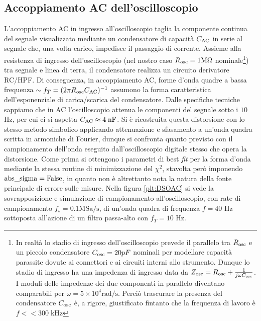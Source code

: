 \documentclass{article}[a4paper, oneside ,11pt]
\begin{document}
\subsection{Accoppiamento AC dell'oscilloscopio}
L’accoppiamento AC in ingresso all’oscilloscopio taglia la componente continua del segnale visualizzato mediante un condensatore di capacità $C_{\rm AC}$ in serie al segnale che, una volta carico, impedisce il passaggio di corrente. Assieme alla resistenza di ingresso dell’oscilloscopio (nel nostro caso $R_{\rm osc} = 1 \si{\mega\ohm}$ nominale\footnote{In realtà lo stadio di ingresso dell’oscilloscopio prevede il parallelo tra $R_{\rm osc}$ e un piccolo condensatore $C_{\rm osc} = 20 pF$ nominali per modellare capacità parassite dovute ai connettori e ai circuiti interni allo strumento. Dunque lo stadio di ingresso ha una impedenza di ingresso data da $Z_{\rm osc}= R_{\rm osc} + \frac{1}{j \omega C_{\rm osc}} $. I moduli delle impedenze dei due componenti in parallelo diventano comparabili per $\omega = 5 \times 10^4 \si{\radian\per\s}$. Perciò trascurare la presenza del condensatore $C_{\rm osc}$ è, a rigore, giustificato fintanto che la frequenza di lavoro è $f << 300 \; \si{\kilo\hertz}$}) tra segnale e linea di terra, il condensatore realizza un circuito derivatore RC/HPF. Di conseguenza, in accoppiamento AC,  forme d’onda quadre a bassa frequenza $\sim f_T = (2\pi R_{\rm osc}C_{\rm AC})^{-1}$ assumono la forma caratteristica dell'esponenziale di carica/scarica del condensatore. Dalle specifiche tecniche sappiamo che in AC l'oscilloscopio attenua le componenti del segnale sotto i $10$ Hz, per cui ci si aspetta $C_{\rm AC} \approx 4 \; \si{\nano\F}$. Si è ricostruita questa distorsione con lo stesso metodo simbolico applicando attenuazione e sfasamento a un'onda quadra scritta in armoniche di Fourier, dunque si confronta quanto previsto con il campionamento dell'onda eseguito dall'oscilloscopio digitale stesso che opera la distorsione. Come prima si ottengono i parametri di best \emph{fit} per la forma d'onda mediante la stessa routine di minimizzazione del $\chi^2$, stavolta però imponendo $\rm{abs\_sigma} = \rm False$, in quanto non è altrettanto nota la natura della fonte principale di errore sulle misure. Nella figura \ref{plt:DSOAC} si vede la sovrapposizione e simulazione di campionamento all’oscilloscopio, con rate di campionamento $f_s = 0.1 \mathrm{MSa/s}$, di un’onda quadra di frequenza $f = 40$ Hz sottoposta all’azione di un filtro passa-alto con $f_T = 10$ Hz. 
\end{document}
